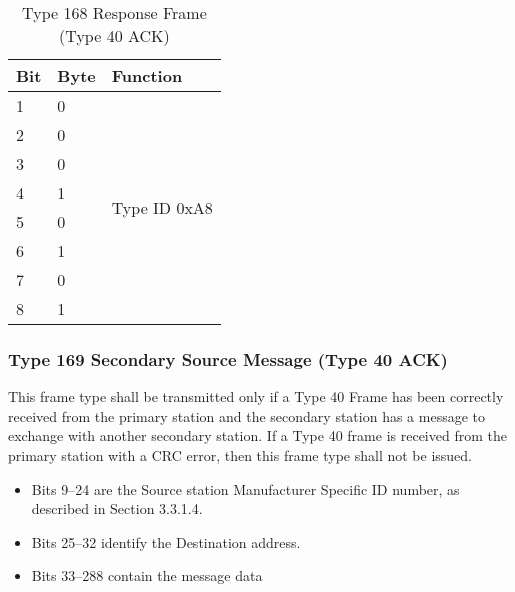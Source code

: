 \documentclass[]{article}
\begin{document}
\begin{table}[ht]
	\centering
	\begin{tabular}{lll}
		\hline
		\textbf{Bit} & \textbf{Byte} & \textbf{Function}             \\ \hline
		1            & 0             & \multirow{8}{*}{Type ID 0xA8} \\
		2            & 0             &                               \\
		3            & 0             &                               \\
		4            & 1             &                               \\
		5            & 0             &                               \\
		6            & 1             &                               \\
		7            & 0             &                               \\
		8            & 1             &                               \\ \hline
	\end{tabular}
	\caption{Type 168 Response Frame (Type 40 ACK)}
	\label{tab:type-168-frame}
\end{table}

\clearpage

\subsubsection{Type 169 Secondary Source Message (Type 40 ACK)}
This frame type shall be transmitted only if a Type 40 Frame has been correctly received from the primary station and the secondary station has a message to exchange with another secondary station. If a Type 40 frame is received from the primary station with a CRC error, then this frame type shall not be issued.

\begin{itemize}
	\item Bits 9–24 are the Source station Manufacturer Specific ID number, as described in Section 3.3.1.4.
	\item Bits 25–32 identify the Destination address.
	\item Bits 33–288 contain the message data
\end{itemize}
\end{document}
